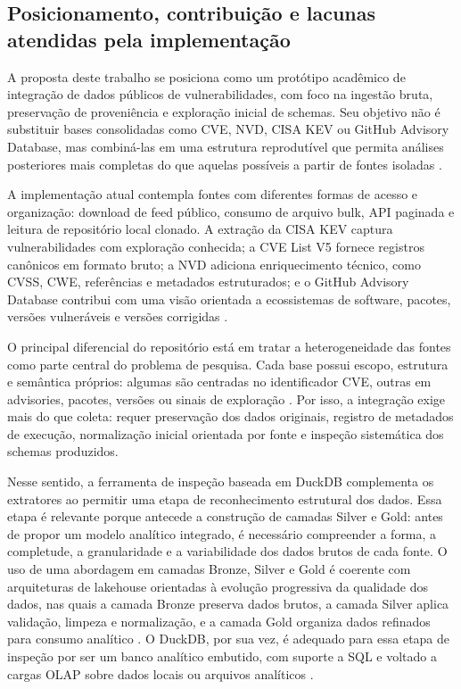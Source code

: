 \subsection{Posicionamento, contribuição e lacunas atendidas pela implementação}

A proposta deste trabalho se posiciona como um protótipo acadêmico de integração de dados públicos de vulnerabilidades, com foco na ingestão bruta, preservação de proveniência e exploração inicial de schemas. Seu objetivo não é substituir bases consolidadas como CVE, NVD, CISA KEV ou GitHub Advisory Database, mas combiná-las em uma estrutura reprodutível que permita análises posteriores mais completas do que aquelas possíveis a partir de fontes isoladas \cite{cve_program_overview,nvd_home,cisa_kev_catalog,github_advisory_database_docs}.

A implementação atual contempla fontes com diferentes formas de acesso e organização: download de feed público, consumo de arquivo bulk, API paginada e leitura de repositório local clonado. A extração da CISA KEV captura vulnerabilidades com exploração conhecida; a CVE List V5 fornece registros canônicos em formato bruto; a NVD adiciona enriquecimento técnico, como CVSS, CWE, referências e metadados estruturados; e o GitHub Advisory Database contribui com uma visão orientada a ecossistemas de software, pacotes, versões vulneráveis e versões corrigidas \cite{cisa_kev_catalog,cve_program_overview,nvd_home,first_cvss,mitre_cwe,github_advisory_database_docs,github_advisory_database_repo}.

O principal diferencial do repositório está em tratar a heterogeneidade das fontes como parte central do problema de pesquisa. Cada base possui escopo, estrutura e semântica próprios: algumas são centradas no identificador CVE, outras em advisories, pacotes, versões ou sinais de exploração \cite{cve_program_overview,nvd_home,github_advisory_database_docs,osv_schema,cisa_kev_catalog,first_epss}. Por isso, a integração exige mais do que coleta: requer preservação dos dados originais, registro de metadados de execução, normalização inicial orientada por fonte e inspeção sistemática dos schemas produzidos.

Nesse sentido, a ferramenta de inspeção baseada em DuckDB complementa os extratores ao permitir uma etapa de reconhecimento estrutural dos dados. Essa etapa é relevante porque antecede a construção de camadas Silver e Gold: antes de propor um modelo analítico integrado, é necessário compreender a forma, a completude, a granularidade e a variabilidade dos dados brutos de cada fonte. O uso de uma abordagem em camadas Bronze, Silver e Gold é coerente com arquiteturas de lakehouse orientadas à evolução progressiva da qualidade dos dados, nas quais a camada Bronze preserva dados brutos, a camada Silver aplica validação, limpeza e normalização, e a camada Gold organiza dados refinados para consumo analítico \cite{databricks_medallion_architecture}. O DuckDB, por sua vez, é adequado para essa etapa de inspeção por ser um banco analítico embutido, com suporte a SQL e voltado a cargas OLAP sobre dados locais ou arquivos analíticos \cite{duckdb_why_duckdb,raasveldt2019_duckdb}.

